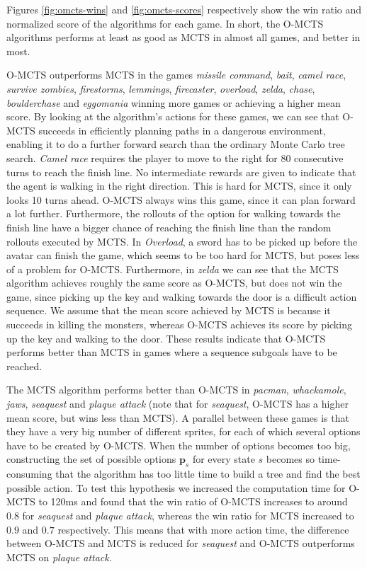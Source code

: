 Figures \ref{fig:omcts-wins} and \ref{fig:omcts-scores} respectively show the
win ratio and normalized score of the algorithms for each game. In short, the
O-MCTS algorithms performs at least as good as MCTS in almost all games, and
better in most.

O-MCTS outperforms MCTS in the games \textit{missile command}, \textit{bait},
\textit{camel race}, \textit{survive zombies}, \textit{firestorms},
\textit{lemmings}, \textit{firecaster}, \textit{overload}, \textit{zelda},
\textit{chase}, \textit{boulderchase} and \textit{eggomania} winning more games
or achieving a higher mean score. By looking at the algorithm's actions for
these games, we can see that O-MCTS succeeds in efficiently planning paths in a
dangerous environment, enabling it to do a further forward search than the
ordinary Monte Carlo tree search. 
\textit{Camel race} requires the player to
move to the right for 80 consecutive turns to reach the finish line. No
intermediate rewards are given to indicate that the agent is walking in the
right direction. This is hard for MCTS, since it only looks 10 turns ahead.
O-MCTS always wins this game, since it can plan forward a lot further.
Furthermore, the rollouts of the option for walking towards the finish line have
a bigger chance of reaching the finish line than the random rollouts executed by
MCTS. 
In \textit{Overload}, a sword has to be picked up before the avatar can finish the
game, which seems to be too hard for MCTS, but poses less of a problem for
O-MCTS.  Furthermore, in \textit{zelda} we can see that the MCTS algorithm
achieves roughly the same score as O-MCTS, but does not win the game, since
picking up the key and walking towards the door is a difficult action sequence.
We assume that the mean score achieved by MCTS is because it succeeds in killing
the monsters, whereas O-MCTS achieves its score by picking up the key and
walking to the door.  These results indicate that O-MCTS performs better than
MCTS in games where a sequence subgoals have to be reached.

The MCTS algorithm performs better than O-MCTS in \textit{pacman},
\textit{whackamole}, \textit{jaws}, \textit{seaquest} and \textit{plaque attack}
(note that for \textit{seaquest}, O-MCTS has a higher mean score, but wins less
than MCTS). A parallel between these games is that they have a very
big number of different sprites, for each of which several options have to be
created by O-MCTS. When the number of options becomes too big, constructing the
set of possible options $\mathbf{p}_s$ for every state $s$ becomes so
time-consuming that the algorithm has too little time to build a tree and find
the best possible action. To test this hypothesis we increased the computation
time for O-MCTS to 120ms and found that the win ratio of O-MCTS increases to
around $0.8$ for \textit{seaquest} and \textit{plaque attack}, whereas the win
ratio for MCTS increased to $0.9$ and $0.7$ respectively. This means that with
more action time, the difference between O-MCTS and MCTS is reduced for
\textit{seaquest} and O-MCTS outperforms MCTS on \textit{plaque attack}.

